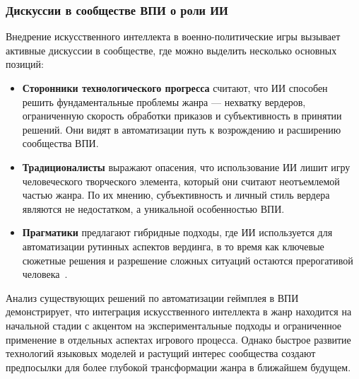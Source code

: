 \subsubsection{Дискуссии в сообществе ВПИ о роли ИИ}

Внедрение искусственного интеллекта в военно-политические игры вызывает активные дискуссии в сообществе, где можно выделить несколько основных позиций:

\begin{itemize}
    \item \textbf{Сторонники технологического прогресса} считают, что ИИ способен решить фундаментальные проблемы жанра — нехватку вердеров, ограниченную скорость обработки приказов и субъективность в принятии решений. Они видят в автоматизации путь к возрождению и расширению сообщества ВПИ.

    \item \textbf{Традиционалисты} выражают опасения, что использование ИИ лишит игру человеческого творческого элемента, который они считают неотъемлемой частью жанра. По их мнению, субъективность и личный стиль вердера являются не недостатком, а уникальной особенностью ВПИ.

    \item \textbf{Прагматики} предлагают гибридные подходы, где ИИ используется для автоматизации рутинных аспектов вердинга, в то время как ключевые сюжетные решения и разрешение сложных ситуаций остаются прерогативой человека~\cite{wpg-ai-debate}.
\end{itemize}

Анализ существующих решений по автоматизации геймплея в ВПИ демонстрирует, что интеграция искусственного интеллекта в жанр находится на начальной стадии с акцентом на экспериментальные подходы и ограниченное применение в отдельных аспектах игрового процесса. Однако быстрое развитие технологий языковых моделей и растущий интерес сообщества создают предпосылки для более глубокой трансформации жанра в ближайшем будущем.
